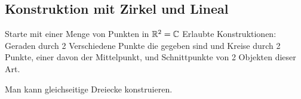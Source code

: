 \subsection{Konstruktion mit Zirkel und Lineal}
Starte mit einer Menge von Punkten in \(\mathbb{R}^2=\mathbb{C}\)
Erlaubte Konstruktionen: Geraden durch 2 Verschiedene Punkte die gegeben sind und Kreise durch 2 Punkte, einer davon der Mittelpunkt, und Schnittpunkte von 2 Objekten dieser Art.
\begin{Bsp}
    Man kann gleichseitige Dreiecke konstruieren.
\begin{center}\end{center}
\end{Bsp}
